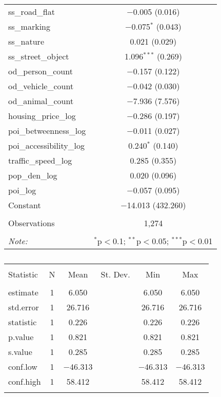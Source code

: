 \begin{table}[!htbp]
\begin{tabular}{@{\extracolsep{1pt}}lc}
  ss\_road\_flat & $-$0.005 (0.016) \\ 
  ss\_marking & $-$0.075$^{*}$ (0.043) \\ 
  ss\_nature & 0.021 (0.029) \\ 
  ss\_street\_object & 1.096$^{***}$ (0.269) \\ 
  od\_person\_count & $-$0.157 (0.122) \\ 
  od\_vehicle\_count & $-$0.042 (0.030) \\ 
  od\_animal\_count & $-$7.936 (7.576) \\ 
  housing\_price\_log & $-$0.286 (0.197) \\ 
  poi\_betweenness\_log & $-$0.011 (0.027) \\ 
  poi\_accessibility\_log & 0.240$^{*}$ (0.140) \\ 
  traffic\_speed\_log & 0.285 (0.355) \\ 
  pop\_den\_log & 0.020 (0.096) \\ 
  poi\_log & $-$0.057 (0.095) \\ 
  Constant & $-$14.013 (432.260) \\ 
 \hline \\[-1.8ex] 
Observations & 1,274 \\ 
\hline 
\hline \\[-1.8ex] 
\textit{Note:}  & \multicolumn{1}{r}{$^{*}$p$<$0.1; $^{**}$p$<$0.05; $^{***}$p$<$0.01} \\ 
\end{tabular} 
\end{table} 

\begin{table}[!htbp] \centering 
  \caption{} 
  \label{} 
\small 
\begin{tabular}{@{\extracolsep{1pt}}lccccc} 
\\[-1.8ex]\hline 
\hline \\[-1.8ex] 
Statistic & \multicolumn{1}{c}{N} & \multicolumn{1}{c}{Mean} & \multicolumn{1}{c}{St. Dev.} & \multicolumn{1}{c}{Min} & \multicolumn{1}{c}{Max} \\ 
\hline \\[-1.8ex] 
estimate & 1 & 6.050 &  & 6.050 & 6.050 \\ 
std.error & 1 & 26.716 &  & 26.716 & 26.716 \\ 
statistic & 1 & 0.226 &  & 0.226 & 0.226 \\ 
p.value & 1 & 0.821 &  & 0.821 & 0.821 \\ 
s.value & 1 & 0.285 &  & 0.285 & 0.285 \\ 
conf.low & 1 & $-$46.313 &  & $-$46.313 & $-$46.313 \\ 
conf.high & 1 & 58.412 &  & 58.412 & 58.412 \\ 
\hline \\[-1.8ex] 
\end{tabular} 
\end{table} 

